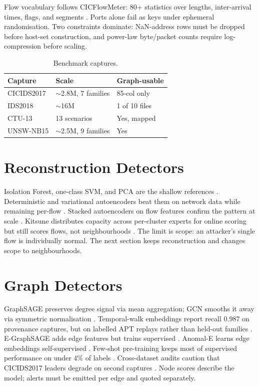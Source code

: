 \documentclass[conference]{IEEEtran}
\begin{document}
Flow vocabulary follows CICFlowMeter: 80+ statistics over lengths, inter-arrival times, flags, and segments \cite{lashkari2017}. Ports alone fail as keys under ephemeral randomisation. Two constraints dominate: NaN-address rows must be dropped before host-set construction, and power-law byte/packet counts require log-compression before scaling.

\begin{table}[htbp]
\caption{Benchmark captures.}
\label{tab:captures}
\centering
\begin{tabular}{@{}lll@{}}
\toprule
Capture & Scale & Graph-usable \\
\midrule
CICIDS2017 \cite{sharafaldin2018} & $\sim$2.8M, 7 families & 85-col only \\
IDS2018 \cite{ids2018} & $\sim$16M & 1 of 10 files \\
CTU-13 \cite{garcia2014} & 13 scenarios & Yes, mapped \\
UNSW-NB15 \cite{moustafa2015} & $\sim$2.5M, 9 families & Yes \\
\bottomrule
\end{tabular}
\end{table}

\section{Reconstruction Detectors}
Isolation Forest, one-class SVM, and PCA are the shallow references \cite{liu2008,scholkopf1999,hodge2004}. Deterministic and variational autoencoders beat them on network data while remaining per-flow \cite{sakurada2014,an2015}. Stacked autoencoders on flow features confirm the pattern at scale \cite{shone2018}. Kitsune distributes capacity across per-cluster experts for online scoring but still scores flows, not neighbourhoods \cite{mirsky2018}. The limit is scope: an attacker's single flow is individually normal. The next section keeps reconstruction and changes scope to neighbourhoods.

\section{Graph Detectors}
GraphSAGE preserves degree signal via mean aggregation; GCN smooths it away via symmetric normalisation \cite{hamilton2017,kipf2017}. Temporal-walk embeddings report recall 0.987 on provenance captures, but on labelled APT replays rather than held-out families \cite{paudel2022}. E-GraphSAGE adds edge features but trains supervised \cite{lo2022}. Anomal-E learns edge embeddings self-supervised \cite{caville2022}. Few-shot pre-training keeps most of supervised performance on under 4\% of labels \cite{gu2024}. Cross-dataset audits caution that CICIDS2017 leaders degrade on second captures \cite{wang2025}. Node scores describe the model; alerts must be emitted per edge and quoted separately.
\end{document}
